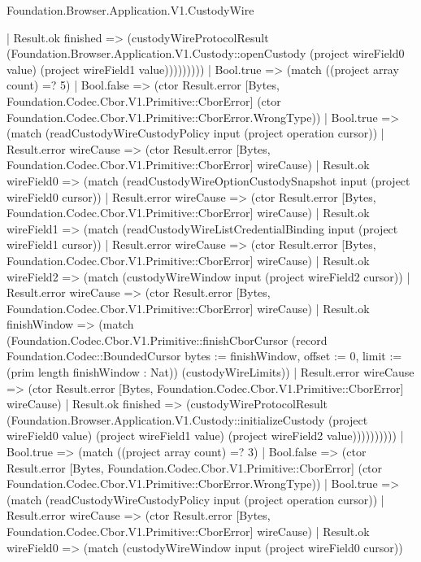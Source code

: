 \begin{lexlean}{Foundation.Browser.Application.V1.CustodyWire}
\begin{semanticmodule}
{                          | Result.ok finished => (custodyWireProtocolResult (Foundation.Browser.Application.V1.Custody::openCustody (project wireField0 value) (project wireField1 value)))))))))
              | Bool.true => (match ((project array count) =? 5)
                | Bool.false => (ctor Result.error [Bytes, Foundation.Codec.Cbor.V1.Primitive::CborError] (ctor Foundation.Codec.Cbor.V1.Primitive::CborError.WrongType))
                | Bool.true => (match (readCustodyWireCustodyPolicy input (project operation cursor))
                  | Result.error wireCause => (ctor Result.error [Bytes, Foundation.Codec.Cbor.V1.Primitive::CborError] wireCause)
                  | Result.ok wireField0 => (match (readCustodyWireOptionCustodySnapshot input (project wireField0 cursor))
                    | Result.error wireCause => (ctor Result.error [Bytes, Foundation.Codec.Cbor.V1.Primitive::CborError] wireCause)
                    | Result.ok wireField1 => (match (readCustodyWireListCredentialBinding input (project wireField1 cursor))
                      | Result.error wireCause => (ctor Result.error [Bytes, Foundation.Codec.Cbor.V1.Primitive::CborError] wireCause)
                      | Result.ok wireField2 => (match (custodyWireWindow input (project wireField2 cursor))
                        | Result.error wireCause => (ctor Result.error [Bytes, Foundation.Codec.Cbor.V1.Primitive::CborError] wireCause)
                        | Result.ok finishWindow => (match (Foundation.Codec.Cbor.V1.Primitive::finishCborCursor (record Foundation.Codec::BoundedCursor {bytes := finishWindow, offset := 0, limit := (prim length finishWindow : Nat)}) (custodyWireLimits))
                          | Result.error wireCause => (ctor Result.error [Bytes, Foundation.Codec.Cbor.V1.Primitive::CborError] wireCause)
                          | Result.ok finished => (custodyWireProtocolResult (Foundation.Browser.Application.V1.Custody::initializeCustody (project wireField0 value) (project wireField1 value) (project wireField2 value))))))))))
            | Bool.true => (match ((project array count) =? 3)
              | Bool.false => (ctor Result.error [Bytes, Foundation.Codec.Cbor.V1.Primitive::CborError] (ctor Foundation.Codec.Cbor.V1.Primitive::CborError.WrongType))
              | Bool.true => (match (readCustodyWireCustodyPolicy input (project operation cursor))
                | Result.error wireCause => (ctor Result.error [Bytes, Foundation.Codec.Cbor.V1.Primitive::CborError] wireCause)
                | Result.ok wireField0 => (match (custodyWireWindow input (project wireField0 cursor))
}
\end{semanticmodule}
\end{lexlean}
